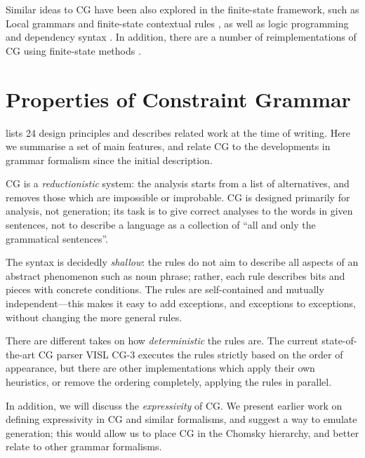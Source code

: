 Similar ideas to CG have been also explored in the finite-state framework, such as Local grammars \cite{gross1997local} and finite-state contextual rules \cite{grana2003fst}, as well as logic programming \cite{oflazer97votingconstraints,lager98} and dependency syntax \cite{tapanainen97fdg}. 
 In addition, there are a number of reimplementations of CG using finite-state methods \cite{yli-jyra2011cg_engine,hulden2011cg_engine,peltonen2011}. 




\section{Properties of Constraint Grammar}\label{sec:properties}

\cite{karlsson1995constraint} lists 24 design principles and describes
related work at the time of writing.
Here we summarise a set of main features, and relate CG to the developments in grammar formalism since the initial description.

CG is a \emph{reductionistic} system: the analysis starts from a list of alternatives,
and removes those which are impossible or improbable.
CG is designed primarily for analysis, not generation; its task is 
to give correct analyses to the words in given sentences,
not to describe a language as a collection of ``all and only the grammatical sentences''.

The syntax is decidedly \emph{shallow}: the rules do not aim to
describe all aspects of an abstract phenomenon such as noun phrase; 
rather, each rule describes bits and pieces with concrete conditions.
The rules are self-contained and mutually independent---this makes it 
easy to add exceptions, and exceptions to exceptions, without 
changing the more general rules.

There are different takes on how \emph{deterministic} the rules are.
The current state-of-the-art CG parser VISL CG-3 executes the rules strictly 
based on the order of appearance, but there are other implementations which 
apply their own heuristics, or remove the ordering completely, 
applying the rules in parallel. %

In addition, we will discuss the \emph{expressivity} of CG. 
We present earlier work on defining expressivity in CG and similar formalisms,
and suggest a way to emulate generation; this would allow us to place CG in the Chomsky hierarchy, and better relate to other grammar formalisms.


